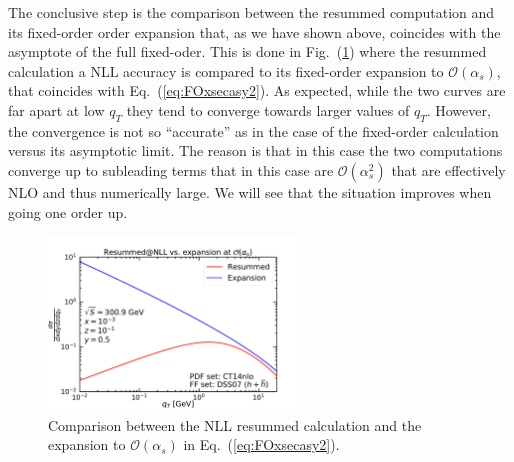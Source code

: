 \documentclass[10pt,a4paper]{article}
\begin{document}
The conclusive step is the comparison between the resummed computation
and its fixed-order order expansion that, as we have shown above,
coincides with the asymptote of the full fixed-oder. This is done in
Fig.~(\ref{fig:ResVsExp}) where the resummed calculation a NLL
accuracy is compared to its fixed-order expansion to
$\mathcal{O}(\alpha_s)$, that coincides with
Eq.~(\ref{eq:FOxsecasy2}). As expected, while the two curves are far
apart at low $q_T$ they tend to converge towards larger values of
$q_T$. However, the convergence is not so ``accurate'' as in the case
of the fixed-order calculation versus its asymptotic limit. The reason
is that in this case the two computations converge up to subleading
terms that in this case are $\mathcal{O}(\alpha_s^2)$ that are
effectively NLO and thus numerically large. We will see that the
situation improves when going one order up.
\begin{figure}[t]
  \begin{centering}
    \includegraphics[width=0.6\textwidth]{plots/ResVsExp}
    \caption{Comparison between the NLL resummed calculation and the
      expansion to $\mathcal{O}(\alpha_s)$ in
      Eq.~(\ref{eq:FOxsecasy2}).\label{fig:ResVsExp}}
  \end{centering}
\end{figure}
\end{document}

